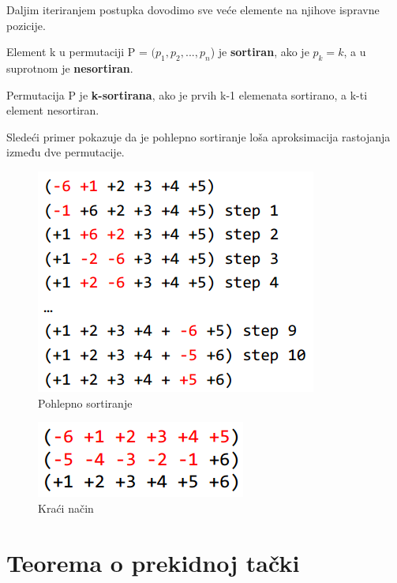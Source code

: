 \noindent Daljim iteriranjem postupka dovodimo sve veće elemente na njihove ispravne pozicije.

\newpage
\begin{definicija}{Element k u permutaciji P = $(p_1, p_2, ..., p_n$) je \textbf{sortiran}, ako je $p_k = k$, a u suprotnom je \textbf{nesortiran}.}
\end{definicija}

\begin{definicija}{Permutacija P je \textbf{k-sortirana}, ako je prvih k-1 elemenata sortirano, a k-ti element nesortiran.}
\end{definicija}

\noindent Sledeći primer pokazuje da je pohlepno sortiranje loša aproksimacija rastojanja između dve permutacije.\\

\begin{figure}[h]
\centering
\includegraphics[scale=0.75]{poglavlja/6/slike/los_greedy.PNG}
\caption{Pohlepno sortiranje}
\label{slika:X}
\end{figure}

\begin{figure}[h]
\centering
\includegraphics[scale=0.75]{poglavlja/6/slike/kraci.PNG}
\caption{Kraći način}
\label{slika:X}
\end{figure}

\section{Teorema o prekidnoj tački}

